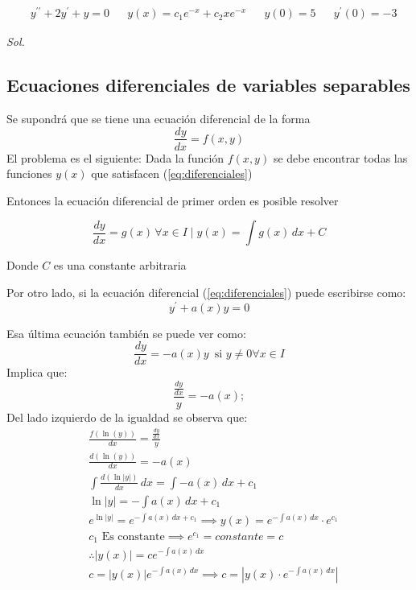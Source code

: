 \begin{example}
    \begin{align*}
        &y^{\prime\prime}+2y^{\prime}+y=0&& y(x)=c_1e^{-x}+c_2xe^{-x}&&y(0)=5&&y^{\prime}(0)=-3
    \end{align*}
\end{example}

\textit{ Sol. }

\subsection{Ecuaciones diferenciales de variables separables}

Se supondrá que se tiene una ecuación diferencial de la forma
\begin{equation}
\frac{dy}{dx}=f(x,y)
\label{eq:diferenciales}
\end{equation}
El problema es el siguiente: Dada la función $f(x,y)$ se debe encontrar todas las funciones $y(x)$ que satisfacen (\eqref{eq:diferenciales})

Entonces la ecuación diferencial de primer orden es posible resolver 

\begin{equation}
    \frac{dy}{dx}=g(x)\, \forall x\in I\mid y(x)=\int g(x)\, dx+C 
\end{equation}

Donde $C$ es una constante arbitraria

Por otro lado, si la ecuación diferencial (\eqref{eq:diferenciales}) puede escribirse como: 
\begin{equation*}
    y^{\prime}+a(x)y=0
\end{equation*}

Esa última ecuación también se puede ver como: 
\begin{equation}
    \frac{dy}{dx}=-a(x)y\,\text{ si } y\neq 0\forall x\in I
\end{equation}
Implica que:
\begin{equation*}
    \frac{\frac{dy}{dx}}{y}=-a(x);
\end{equation*}
Del lado izquierdo de la igualdad se observa que: 
\begin{align*}
    &\frac{f\left(\ln{(y)}\right)}{dx}=\frac{\frac{dy}{dx}}{y}\\
    &\frac{d\left(\ln{(y)}\right)}{dx}=-a(x)\\
    &\int \frac{d\left(\ln{\left\lvert y\right\rvert }\right)}{dx}\, dx=\int -a(x)\,dx +c_1\\
    &\ln{\left\lvert y\right\rvert }=-\int a(x)\,dx +c_1\\
    &e^{\ln{\left\lvert y\right\rvert }}=e^{-\int a(x)\,dx +c_1}\implies y(x)=e^{-\int a(x)\,dx}\cdot e^{c_1}\\
    &c_1\text{ Es constante}\implies e^{c_1}=constante=c\\
    &\therefore \left\lvert y(x)\right\rvert=ce^{-\int a(x)\,dx}\\
    &c=\left\lvert y(x)\right\rvert e^{-\int a(x)\,dx}\implies c=\left\lvert y(x)\cdot e^{-\int a(x)\,dx}\right\rvert
\end{align*}

